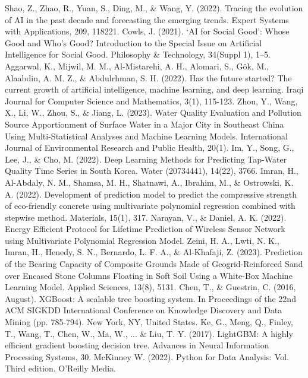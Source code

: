 \documentclass[12pt,a4paper]{article}
\begin{document}
\begin{enumerate}
\begin{thebibliography}{99}
 Shao, Z., Zhao, R., Yuan, S., Ding, M., \& Wang, Y. (2022). Tracing the evolution of AI in the past decade and forecasting the emerging trends. Expert Systems with Applications, 209, 118221.
 Cowls, J. (2021). ‘AI for Social Good’: Whose Good and Who’s Good? Introduction to the Special Issue on Artificial Intelligence for Social Good. Philosophy \& Technology, 34(Suppl 1), 1–5. 
 Aggarwal, K., Mijwil, M. M., Al-Mistarehi, A. H., Alomari, S., Gök, M., Alaabdin, A. M. Z., \& Abdulrhman, S. H. (2022). Has the future started? The current growth of artificial intelligence, machine learning, and deep learning. Iraqi Journal for Computer Science and Mathematics, 3(1), 115-123.
 Zhou, Y., Wang, X., Li, W., Zhou, S., \& Jiang, L. (2023). Water Quality Evaluation and Pollution Source Apportionment of Surface Water in a Major City in Southeast China Using Multi-Statistical Analyses and Machine Learning Models. International Journal of Environmental Research and Public Health, 20(1). 
 Im, Y., Song, G., Lee, J., \& Cho, M. (2022). Deep Learning Methods for Predicting Tap-Water Quality Time Series in South Korea. Water (20734441), 14(22), 3766. 
 Imran, H., Al-Abdaly, N. M., Shamsa, M. H., Shatnawi, A., Ibrahim, M., \& Ostrowski, K. A. (2022). Development of prediction model to predict the compressive strength of eco-friendly concrete using multivariate polynomial regression combined with stepwise method. Materials, 15(1), 317.
 Narayan, V., \& Daniel, A. K. (2022). Energy Efficient Protocol for Lifetime Prediction of Wireless Sensor Network using Multivariate Polynomial Regression Model.
 Zeini, H. A., Lwti, N. K., Imran, H., Henedy, S. N., Bernardo, L. F. A., \& Al-Khafaji, Z. (2023). Prediction of the Bearing Capacity of Composite Grounds Made of Geogrid-Reinforced Sand over Encased Stone Columns Floating in Soft Soil Using a White-Box Machine Learning Model. Applied Sciences, 13(8), 5131.
 Chen, T., \& Guestrin, C. (2016, August). XGBoost: A scalable tree boosting system. In Proceedings of the 22nd ACM SIGKDD International Conference on Knowledge Discovery and Data Mining (pp. 785-794). New York, NY, United States.
 Ke, G., Meng, Q., Finley, T., Wang, T., Chen, W., Ma, W., ... \& Liu, T. Y. (2017). LightGBM: A highly efficient gradient boosting decision tree. Advances in Neural Information Processing Systems, 30.
 McKinney W. (2022). Python for Data Analysis: Vol. Third edition. O’Reilly Media.

\end{thebibliography}
\end{enumerate}
\end{document}
